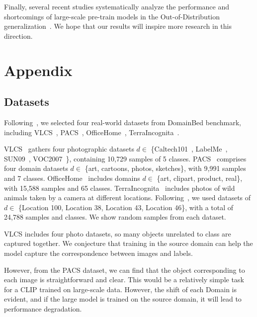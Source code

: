 \documentclass[letterpaper]{article} \usepackage[]{aaai23}
\begin{document}
Finally, several recent studies systematically analyze the performance and shortcomings of large-scale pre-train models in the Out-of-Distribution generalization~\cite{cha2022domain,wenzel2022assaying}.
We hope that our results will inspire more research in this direction.



\newpage
\section{Appendix}
\subsection{Datasets}


Following~\cite{iwasawa2021testtime}, we selected four real-world datasets from DomainBed benchmark, including VLCS~\cite{fang2013unbiased}, PACS~\cite{li2017deeper}, OfficeHome~\cite{venkateswara2017deep}, TerraIncognita~\cite{beery2018recognition}.

VLCS~\cite{fang2013unbiased} gathers four photographic datasets 
$d \in$ \{Caltech101~\cite{fei2006one}, LabelMe~\cite{russell2008labelme}, SUN09~\cite{choi2010exploiting}, VOC2007~\cite{everingham2009pascal}\}, 
containing 10,729 samples of 5 classes.
PACS~\cite{li2017deeper}  comprises four domain datasets $d \in$ \{art, cartoons, photos, sketches\}, with 9,991 samples and 7 classes.
OfficeHome~\cite{venkateswara2017deep}  includes domains $d \in$ \{art, clipart, product, real\}, with 15,588 samples and 65 classes. 
TerraIncognita~\cite{beery2018recognition} includes photos of wild animals taken by a camera at different locations.
Following~\cite{gulrajani2020search}, we used datasets of $d \in$ \{Location 100, Location 38, Location 43, Location 46\}, with a total of 24,788 samples and classes.
We show random samples from each dataset.


VLCS includes four photo datasets, so many objects unrelated to class are captured together. 
We conjecture that training in the source domain can help the model capture the correspondence between images and labels.

However, from the PACS dataset, we can find that the object corresponding to each image is straightforward and clear. 
This would be a relatively simple task for a CLIP trained on large-scale data. 
However, the shift of each Domain is evident, and if the large model is trained on the source domain, it will lead to performance degradation.
\end{document}
